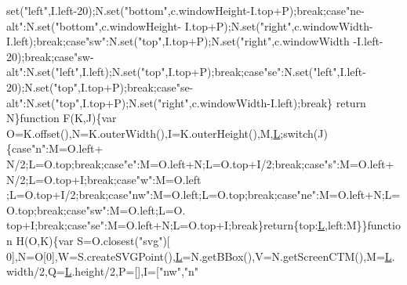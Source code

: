 \begin{DoxyCode}
{      set(\textcolor{stringliteral}{"left"},I.left-20);N.set(\textcolor{stringliteral}{"bottom"},c.windowHeight-I.top+P);\textcolor{keywordflow}{break};\textcolor{keywordflow}{case}\textcolor{stringliteral}{"ne-alt"}:N.set(\textcolor{stringliteral}{"bottom"},c.windowHeight-
      I.top+P);N.set(\textcolor{stringliteral}{"right"},c.windowWidth-I.left);\textcolor{keywordflow}{break};\textcolor{keywordflow}{case}\textcolor{stringliteral}{"sw"}:N.set(\textcolor{stringliteral}{"top"},I.top+P);N.set(\textcolor{stringliteral}{"right"},c.windowWidth
      -I.left-20);\textcolor{keywordflow}{break};\textcolor{keywordflow}{case}\textcolor{stringliteral}{"sw-alt"}:N.set(\textcolor{stringliteral}{"left"},I.left);N.set(\textcolor{stringliteral}{"top"},I.top+P);\textcolor{keywordflow}{break};\textcolor{keywordflow}{case}\textcolor{stringliteral}{"se"}:N.set(\textcolor{stringliteral}{"left"},I.left-
      20);N.set(\textcolor{stringliteral}{"top"},I.top+P);\textcolor{keywordflow}{break};\textcolor{keywordflow}{case}\textcolor{stringliteral}{"se-alt"}:N.set(\textcolor{stringliteral}{"top"},I.top+P);N.set(\textcolor{stringliteral}{"right"},c.windowWidth-I.left);\textcolor{keywordflow}{break}\}\textcolor{keywordflow}{
      return} N\}\textcolor{keyword}{function} F(K,J)\{var O=K.offset(),N=K.outerWidth(),I=K.outerHeight(),M,\hyperlink{jquery_8js_a38ee4c0b5f4fe2a18d0c783af540d253}{L};\textcolor{keywordflow}{switch}(J)\{\textcolor{keywordflow}{case}\textcolor{stringliteral}{"n"}:M=O.left+
      N/2;L=O.top;\textcolor{keywordflow}{break};\textcolor{keywordflow}{case}\textcolor{stringliteral}{"e"}:M=O.left+N;L=O.top+I/2;\textcolor{keywordflow}{break};\textcolor{keywordflow}{case}\textcolor{stringliteral}{"s"}:M=O.left+N/2;L=O.top+I;\textcolor{keywordflow}{break};\textcolor{keywordflow}{case}\textcolor{stringliteral}{"w"}:M=O.left
      ;L=O.top+I/2;\textcolor{keywordflow}{break};\textcolor{keywordflow}{case}\textcolor{stringliteral}{"nw"}:M=O.left;L=O.top;\textcolor{keywordflow}{break};\textcolor{keywordflow}{case}\textcolor{stringliteral}{"ne"}:M=O.left+N;L=O.top;\textcolor{keywordflow}{break};\textcolor{keywordflow}{case}\textcolor{stringliteral}{"sw"}:M=O.left;L=O.
      top+I;\textcolor{keywordflow}{break};\textcolor{keywordflow}{case}\textcolor{stringliteral}{"se"}:M=O.left+N;L=O.top+I;\textcolor{keywordflow}{break}\}\textcolor{keywordflow}{return}\{top:\hyperlink{jquery_8js_a38ee4c0b5f4fe2a18d0c783af540d253}{L},left:M\}\}\textcolor{keyword}{function} H(O,K)\{var S=O.closest(\textcolor{stringliteral}{"svg"})[
      0],N=O[0],W=S.createSVGPoint(),\hyperlink{jquery_8js_a38ee4c0b5f4fe2a18d0c783af540d253}{L}=N.getBBox(),V=N.getScreenCTM(),M=\hyperlink{jquery_8js_a38ee4c0b5f4fe2a18d0c783af540d253}{L}.width/2,Q=\hyperlink{jquery_8js_a38ee4c0b5f4fe2a18d0c783af540d253}{L}.height/2,P=[],I=[\textcolor{stringliteral}{"nw"},\textcolor{stringliteral}{"n"}
}
\end{DoxyCode}
